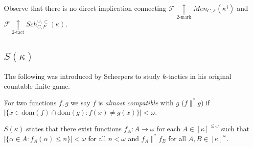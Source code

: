\documentclass{beamer}
\theoremstyle{example}
\theoremstyle{definition}
\newcommand{\kmarkwin}[1]{\underset{#1\text{-mark}}{\uparrow}}
\newcommand{\ktactwin}[1]{\underset{#1\text{-tact}}{\uparrow}}
\newcommand{\oneptlind}[1]{#1^\dagger} %
\newcommand{\menGame}[1]{Men_{C,F}\left({#1}\right)}
\newcommand{\schFillStrictGame}[1]{Sch^{\cup,\subset}_{C,F}\left({#1}\right)}
\newcommand{\schFillGame}[1]{Sch^{\cup,\subseteq}_{C,F}\left({#1}\right)}
\newcommand{\schFillInitialGame}[1]{Sch^{1,\subseteq}_{C,F}\left({#1}\right)}
\newcommand{\schFillIntGame}[1]{Sch^{\cap}_{C,F}\left({#1}\right)}
\newcommand{\<}{\langle}
\renewcommand{\>}{\rangle}
\newcommand{\al}[1]{{#1}^*}
\newcommand{\alcomp}{\al\parallel}
\newcommand{\dom}{\textrm{dom}}
\newcommand{\alcompS}[1]{S(#1)}
\newcommand{\pl}[1]{\mathscr{#1}}
\newcommand{\term}{\textit}
\begin{document}
\begin{frame}[fragile]\small
  \begin{theorem}
  \end{theorem}

  \pause

  Observe that there is no direct implication connecting
  \(\pl F \kmarkwin{2}\menGame{\oneptlind\kappa}\) and
  \(\pl F \ktactwin{2}\schFillStrictGame\kappa\).
\end{frame}

\subsection{$\alcompS\kappa$}

\begin{frame}
  The following was introduced by Scheepers to study \(k\)-tactics
  in his original countable-finite game.

  \pause

  \begin{definition}
    For two functions \(f,g\) we say \(f\) is
    \term{almost compatible} with
    \(g\) (\(f\alcomp g\)) if
    \(\left|\{x\in\dom(f)\cap\dom(g):f(x)\not=g(x)\}\right|<\omega\).
  \end{definition}

  \pause

  \begin{definition}
    \(\alcompS\kappa\) states that there exist functions
    \(f_A:A\to\omega\) for each \(A\in[\kappa]^{\leq\omega}\) such that
    \(|\{\alpha\in A:f_A(\alpha)\leq n\}|<\omega\) for all \(n<\omega\) and
    \(f_A\alcomp f_B\) for all \(A,B\in[\kappa]^\omega\).
  \end{definition}
\end{frame}
\end{document}
